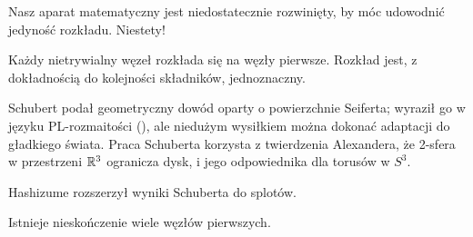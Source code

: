 Nasz aparat matematyczny jest niedostatecznie rozwinięty, by móc udowodnić jedyność rozkładu.
Niestety!

\begin{theorem}[Schubert, 1949]
    Każdy nietrywialny węzeł rozkłada się na węzły pierwsze.
    Rozkład jest, z dokładnością do kolejności składników, jednoznaczny.
%
\end{theorem}

Schubert podał geometryczny dowód oparty o powierzchnie Seiferta; wyraził go w języku PL-rozmaitości (\cite{schubert1949}), ale niedużym wysiłkiem można dokonać adaptacji do gładkiego świata.
%
Praca Schuberta korzysta z twierdzenia Alexandera, że 2-sfera w przestrzeni $\mathbb R^3$ ogranicza dysk, i jego odpowiednika dla torusów w $S^3$.

Hashizume \cite{hashizume1958} rozszerzył wyniki Schuberta do splotów.
%

\begin{proposition}
\label{prp:infinitely_many_prime_knots}%
    Istnieje nieskończenie wiele węzłów pierwszych.
\end{proposition}


